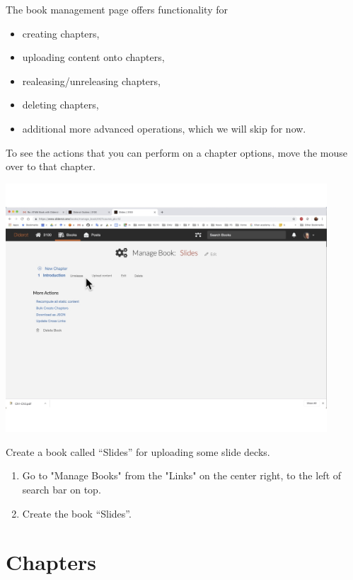 \begin{gram}
The book management page offers functionality for
\begin{itemize}
\item creating chapters,
\item uploading content onto chapters,
\item realeasing/unreleasing chapters,
\item deleting chapters,
\item additional more advanced operations, which we will skip for now.
\end{itemize}

To see the actions that you can perform on a chapter options, move the mouse over to that chapter. 

\includegraphics[width=0.9\textwidth]{staff/media/book-management.jpg}
\end{gram}

\begin{exercise}
Create a book called ``Slides'' for uploading some slide decks. 
\begin{enumerate}
\item Go to "Manage Books" from the "Links" on the center right, to
the left of search bar on top.
\item Create the book ``Slides''.
\end{enumerate}
\end{exercise}

\section{Chapters}
\label{guide:chapter}

